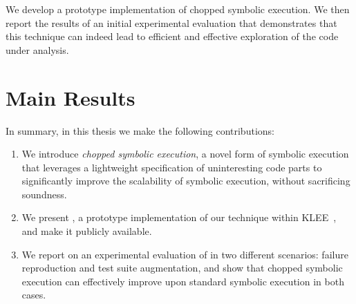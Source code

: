 We develop a prototype implementation of chopped symbolic
execution. We then report the results of an initial experimental
evaluation that demonstrates that this technique can indeed lead to
efficient and effective exploration of the code under analysis.

\section{Main Results}
In summary, in this thesis we make the following contributions:
\begin{enumerate}[leftmargin=*]
\item We introduce \emph{chopped symbolic execution}, a novel form of
  symbolic execution that leverages a lightweight specification of
  uninteresting code parts to significantly improve the scalability of
  symbolic execution, without sacrificing soundness.

\item We present \toolname, a prototype implementation of our
  technique within KLEE~\cite{klee}, and make it publicly available.

\item We report on an experimental evaluation of \toolname in two
  different scenarios: failure reproduction and test suite
  augmentation, and show that chopped symbolic execution can
  effectively improve upon standard symbolic execution in both cases.
\end{enumerate}


